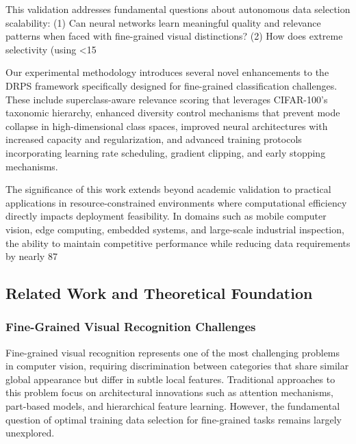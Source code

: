 \documentclass[12pt]{article}
\begin{document}
This validation addresses fundamental questions about autonomous data selection scalability: (1) Can neural networks learn meaningful quality and relevance patterns when faced with fine-grained visual distinctions? (2) How does extreme selectivity (using <15%

Our experimental methodology introduces several novel enhancements to the DRPS framework specifically designed for fine-grained classification challenges. These include superclass-aware relevance scoring that leverages CIFAR-100's taxonomic hierarchy, enhanced diversity control mechanisms that prevent mode collapse in high-dimensional class spaces, improved neural architectures with increased capacity and regularization, and advanced training protocols incorporating learning rate scheduling, gradient clipping, and early stopping mechanisms.

The significance of this work extends beyond academic validation to practical applications in resource-constrained environments where computational efficiency directly impacts deployment feasibility. In domains such as mobile computer vision, edge computing, embedded systems, and large-scale industrial inspection, the ability to maintain competitive performance while reducing data requirements by nearly 87%

\subsection{Related Work and Theoretical Foundation}\label{related-work}

\subsubsection{Fine-Grained Visual Recognition Challenges}\label{fine-grained-challenges}

Fine-grained visual recognition represents one of the most challenging problems in computer vision, requiring discrimination between categories that share similar global appearance but differ in subtle local features. Traditional approaches to this problem focus on architectural innovations such as attention mechanisms, part-based models, and hierarchical feature learning. However, the fundamental question of optimal training data selection for fine-grained tasks remains largely unexplored.
\end{document}
